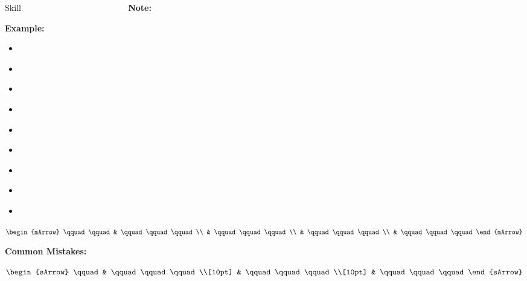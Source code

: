 \clearpage\noindent%


\clearpage\noindent%

\begin{boxSkill}{Skill  $ \quad \quad \quad \quad \quad \quad \quad \quad \quad \quad \quad \quad $ }   %
    \noindent%
	\textbf{Note:}

	 
	\tcbline
	\textbf{Example:}
	\begin{itemize}[leftmargin=0.8cm]
	     \item[] $\qquad\qquad\qquad    $
	     \item[] $\qquad\qquad\qquad    $
	     \item[] $\qquad\qquad\qquad    $ 
	     \item[] $\qquad\qquad\qquad    $
	     \item[] $\qquad\qquad\qquad    $
	     \item[] $\qquad\qquad\qquad    $
	     \item[] $\qquad\qquad\qquad    $ 
	     \item[] $\qquad\qquad\qquad    $
	     \item[] $\qquad\qquad\qquad    $	 
	\end{itemize}

	$\begin{mArrow}
        \qquad \qquad & \qquad\qquad\qquad  \\
                      & \qquad\qquad\qquad  \\
			          & \qquad\qquad\qquad  \\
			          & \qquad\qquad\qquad
 	 \end{mArrow}$\\[0.5cm]
	
	\tcbline
	
    \textbf{Common Mistakes:}\\[0.6cm]
	\begin{warningEnv}
	    $\begin{sArrow}
	        \qquad   & \qquad\qquad\qquad \\[10pt]
	  	             & \qquad\qquad\qquad                                                                        \\[10pt] 
                     & \qquad\qquad\qquad 				   
		 \end{sArrow}$		   
    \end{warningEnv}
\end{boxSkill}

